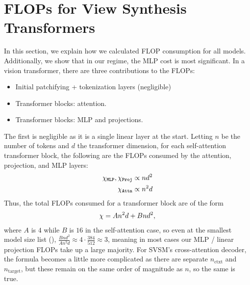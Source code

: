 \clearpage
\maketitlesupplementary



% 
\section{FLOPs for View Synthesis Transformers}
\label{supp:flop-calcs}

In this section, we explain how we calculated FLOP consumption for all models. Additionally, we show that in our regime, the MLP cost is most significant. In a vision transformer, there are three contributions to the FLOPs:
\begin{itemize}
    \item Initial patchifying + tokenization layers (negligible)
    \item Transformer blocks: attention.
    \item Transformer blocks: MLP and projections.
\end{itemize}
The first is negligible as it is a single linear layer at the start. Letting $n$ be the number of tokens and $d$ the transformer dimension, for each self-attention transformer block, the following are the FLOPs consumed by the attention, projection, and MLP layers:
\begin{align}
    \chi_{\mathtt{MLP}}, \chi_{\mathtt{Proj}} &\propto n d^2 \\
    \chi_{\mathtt{Attn}} &\propto n^2 d
\end{align}
Thus, the total FLOPs consumed for a transformer block are of the form
\begin{equation}
    \chi{} = A n^2 d + B nd^2,
\end{equation}
where $A$ is $4$ while $B$ is $16$ in the self-attention case, so even at the smallest model size list (), $\frac{Bnd^2}{An^2d} \approx 4 \cdot \frac{384}{512} \approx 3$, meaning in most cases our MLP / linear projection FLOPs take up a large majority. For SVSM's cross-attention decoder, the formula becomes a little more complicated as there are separate $n_{\text{ctxt}}$ and $n_{\text{target}}$, but these remain on the same order of magnitude as $n$, so the same is true. 

